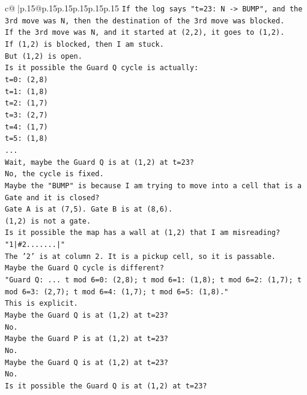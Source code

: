 \documentclass{article}
\begin{document}
{\begin{supertabular}{c@{$\;$}|p{.15\linewidth}@{}p{.15\linewidth}p{.15\linewidth}p{.15\linewidth}p{.15\linewidth}p{.15\linewidth}}
{{{\texttt{If the log says "t=23: N {-}> BUMP", and the 3rd move was N, then the destination of the 3rd move was blocked.} \\
\texttt{If the 3rd move was N, and it started at (2,2), it goes to (1,2).} \\
\texttt{If (1,2) is blocked, then I am stuck.} \\
\texttt{But (1,2) is open.} \\
\texttt{Is it possible the Guard Q cycle is actually:} \\
\texttt{t=0: (2,8)} \\
\texttt{t=1: (1,8)} \\
\texttt{t=2: (1,7)} \\
\texttt{t=3: (2,7)} \\
\texttt{t=4: (1,7)} \\
\texttt{t=5: (1,8)} \\
\texttt{...} \\
\texttt{Wait, maybe the Guard Q is at (1,2) at t=23?} \\
\texttt{No, the cycle is fixed.} \\
\texttt{Maybe the "BUMP" is because I am trying to move into a cell that is a Gate and it is closed?} \\
\texttt{Gate A is at (7,5). Gate B is at (8,6).} \\
\texttt{(1,2) is not a gate.} \\
\texttt{Is it possible the map has a wall at (1,2) that I am misreading?} \\
\texttt{"1|\#2.......|"} \\
\texttt{The '2' is at column 2. It is a pickup cell, so it is passable.} \\
\texttt{Maybe the Guard Q cycle is different?} \\
\texttt{"Guard Q: ... t mod 6=0: (2,8); t mod 6=1: (1,8); t mod 6=2: (1,7); t mod 6=3: (2,7); t mod 6=4: (1,7); t mod 6=5: (1,8)."} \\
\texttt{This is explicit.} \\
\texttt{Maybe the Guard Q is at (1,2) at t=23?} \\
\texttt{No.} \\
\texttt{Maybe the Guard P is at (1,2) at t=23?} \\
\texttt{No.} \\
\texttt{Maybe the Guard Q is at (1,2) at t=23?} \\
\texttt{No.} \\
\texttt{Is it possible the Guard Q is at (1,2) at t=23?} \\
}}}
\end{supertabular}}
\end{document}
